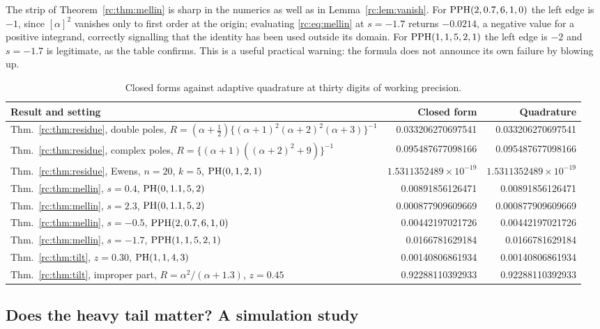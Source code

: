 The strip of Theorem~\ref{rc:thm:mellin} is sharp in the numerics as well as in Lemma~\ref{rc:lem:vanish}. For $\mathrm{PPH}(2,0.7,6,1,0)$ the left edge is $-1$, since $[\alpha]^2$ vanishes only to first order at the origin; evaluating \eqref{rc:eq:mellin} at $s=-1.7$ returns $-0.0214$, a negative value for a positive integrand, correctly signalling that the identity has been used outside its domain. For $\mathrm{PPH}(1,1,5,2,1)$ the left edge is $-2$ and $s=-1.7$ is legitimate, as the table confirms. This is a useful practical warning: the formula does not announce its own failure by blowing up.

\begin{table}[htbp]
\centering\footnotesize
\setlength{\tabcolsep}{3pt}
\begin{tabular}{@{}>{\raggedright\arraybackslash}p{2.05in}rr@{}}
\toprule
Result and setting & Closed form & Quadrature\\
\midrule
Thm.~\ref{rc:thm:residue}, double poles, $R=(\alpha+\frac12)\{(\alpha+1)^2(\alpha+2)^2(\alpha+3)\}^{-1}$ & 0.033206270697541 & 0.033206270697541\\
Thm.~\ref{rc:thm:residue}, complex poles, $R=\{(\alpha+1)((\alpha+2)^2+9)\}^{-1}$ & 0.095487677098166 & 0.095487677098166\\
Thm.~\ref{rc:thm:residue}, Ewens, $n=20$, $k=5$, $\mathrm{PH}(0,1,2,1)$ & $1.5311352489\times10^{-19}$ & $1.5311352489\times10^{-19}$\\
Thm.~\ref{rc:thm:mellin}, $s=0.4$, $\mathrm{PH}(0,1.1,5,2)$ & 0.00891856126471 & 0.00891856126471\\
Thm.~\ref{rc:thm:mellin}, $s=2.3$, $\mathrm{PH}(0,1.1,5,2)$ & 0.000877909609669 & 0.000877909609669\\
Thm.~\ref{rc:thm:mellin}, $s=-0.5$, $\mathrm{PPH}(2,0.7,6,1,0)$ & 0.00442197021726 & 0.00442197021726\\
Thm.~\ref{rc:thm:mellin}, $s=-1.7$, $\mathrm{PPH}(1,1,5,2,1)$ & 0.0166781629184 & 0.0166781629184\\
Thm.~\ref{rc:thm:tilt}, $z=0.30$, $\mathrm{PH}(1,1,4,3)$ & 0.00140806861934 & 0.00140806861934\\
Thm.~\ref{rc:thm:tilt}, improper part, $R=\alpha^2/(\alpha+1.3)$, $z=0.45$ & 0.92288110392933 & 0.92288110392933\\
\bottomrule
\end{tabular}
\caption{Closed forms against adaptive quadrature at thirty digits of working precision.}\label{rc:tab:verify}
\end{table}

\subsection{Does the heavy tail matter? A simulation study}

